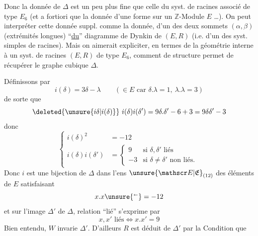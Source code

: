 Donc la donnée de $\Delta$ est un peu plus fine que celle du syst. de racines associé de type $E_6$ (et a fortiori que la donnée d'une forme   sur un $\mathbb Z$-Module $E$ \ldots). On peut interpréter cette donnée suppl. comme la donnée,  d'un des deux sommets
\diagram{\begin{tikzcd}[ampersand replacement=\&,column sep=small,row sep=tiny]
\alpha\,\bullet\arrow[r,dash]\&\bullet\arrow[r,dash]\&\bullet\arrow[r,dash]\arrow[d,dash]\&\bullet\arrow[r,dash]\&\bullet\,\beta\\
\&\&\bullet
\end{tikzcd}}
$(\alpha,\beta)$ (extrémités longues) ``\uline{du}'' diagramme de Dynkin de $(E,R)$ (i.e. d'un des syst. simples de racines). Mais on aimerait expliciter, en termes de la géométrie interne à  un syst. de racines $(E,R)$ de type $E_6$, comment   de structure permet de récupérer le graphe cubique $\Delta$.

Définissons
par
\[
i(\delta)=3\delta-\lambda\qquad(\in E\text{ car }\delta.\lambda=1,\ \lambda.\lambda=3)
\]
de sorte que 
\[
\deleted{\unsure{i\delta|i(\delta)}}\ i(\delta)i(\delta')=9\delta.\delta'-6+3=9\delta\delta'-3
\]
donc
\[
\left\{\begin{aligned}
i(\delta)^2&=-12\\
i(\delta)i(\delta')&=\begin{cases}9&\text{si }\delta,\delta'\text{ liés}\\-3&\text{si }\delta\ne\delta'\text{ non liés}.\end{cases}
\end{aligned}\right.
\]
Donc $i$ est une bijection de $\Delta$ dans  l'ens $\unsure{\mathscr E|\mathfrak E}_{(12)}$ des éléments  de $E$ satisfaisant
\[
x.x\unsure{{}^{\scriptscriptstyle\leftarrow}}=-12
\]
et sur l'image $\Delta'$ de $\Delta$,  relation ``lié'' s'exprime par
\[
x,x'\text{ liés}\Longleftrightarrow x.x'=9
\]
Bien entendu, $W$ invarie $\Delta'$.  D'ailleurs $R$ est déduit de $\Delta'$  par la Condition que 
